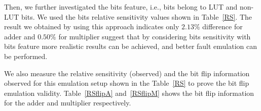 Then, we further investigated the bits feature, i.e., bits belong to LUT and non-LUT bits. We used the bits relative sensitivity values shown in Table~\ref{RS}. The result we obtained by using this approach indicates only $2.13\%$ difference for adder and $0.50\%$ for multiplier suggest that by considering bits sensitivity with bits feature more realistic results can be achieved, and better fault emulation can be performed. 



%
%
%
% 
% 
% 
% 
% 





We also measure the relative sensitivity (observed) and the bit flip information observed for this emulation setup shown in the Table~\ref{RS} to prove the bit flip emulation validity. Table~\ref{RSflipA} and~\ref{RSflipM} shows the bit flip information for the adder and multiplier respectively.


